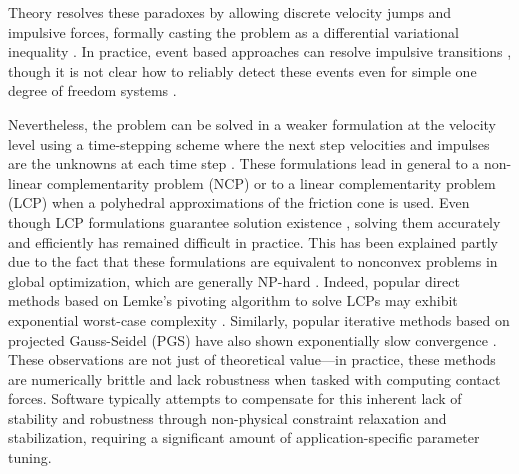 %
Theory resolves these paradoxes by allowing
discrete velocity jumps and impulsive forces, formally casting the problem as a
differential variational inequality \cite{bib:pang2008differential}. In practice,
event based approaches can resolve impulsive transitions \cite{bib:haug1986},
though it is not clear how to reliably detect these events even for simple one degree of
freedom systems \cite{bib:hogan2017regularization}.

Nevertheless, the problem can be solved in a weaker formulation at the velocity
level using a time-stepping scheme where the next step velocities and impulses
are the unknowns at each time
step \cite{bib:stewart1996implicit, bib:anitescu1997}. These formulations lead
in general to a non-linear complementarity problem (NCP) or to a linear
complementarity problem (LCP) when a polyhedral approximations of the friction
cone is used. Even though LCP formulations guarantee solution existence
\cite{bib:anitescu1997, bib:stewart1998convergence}, solving them accurately and
efficiently has remained difficult in practice. This has been explained
partly due to the fact that these formulations are equivalent to nonconvex problems
in global optimization, which are generally NP-hard \cite{bib:Kaufman2008}.
Indeed, popular direct methods based on Lemke's pivoting algorithm to solve
LCPs may exhibit exponential worst-case complexity \cite{bib:baraff1994fast}.
Similarly, popular iterative methods based on projected
Gauss-Seidel (PGS) \cite{bib:duriez2006_realistic_haptic_rendering, bib:bullet}
have also shown exponentially slow convergence \cite{bib:erleben2007velocity}.
These observations are not just of theoretical value---in practice,
these methods are numerically brittle and lack robustness when tasked with computing contact forces.
Software typically attempts to compensate for this inherent lack of stability 
and robustness through non-physical constraint relaxation and stabilization,
requiring a significant amount of application-specific parameter tuning.

